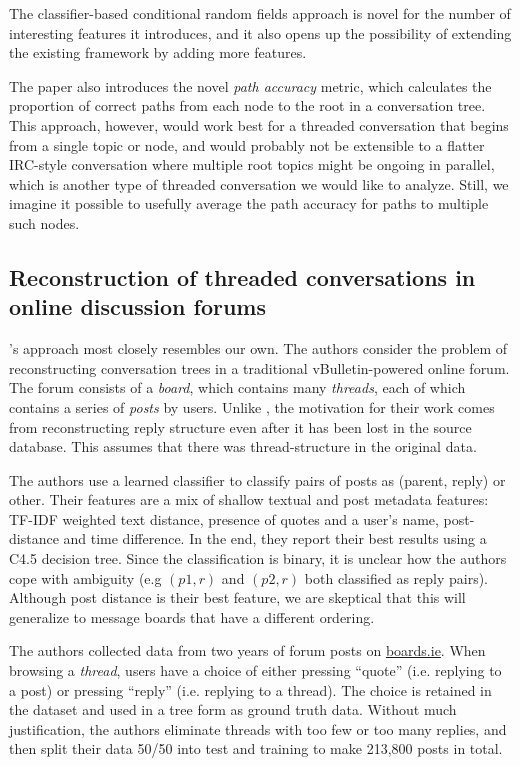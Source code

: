 \documentclass{article}
\begin{document}
The classifier-based conditional random fields approach is novel for the number
of interesting features it introduces, and it also opens up the possibility of
extending the existing framework by adding more features.

The paper also introduces the novel \emph{path accuracy} metric, which
calculates the proportion of correct paths from each node to the root in a
conversation tree. This approach, however, would work best for a threaded
conversation that begins from a single topic or node, and would probably not be
extensible to a flatter IRC-style conversation where multiple root topics might
be ongoing in parallel, which is another type of threaded conversation we would
like to analyze. Still, we imagine it possible to usefully average the path
accuracy for paths to multiple such nodes.

\subsection{Reconstruction of threaded conversations in online discussion
forums}
\cite{Aumayr2011a}'s approach most closely resembles our own. The authors
consider the problem of reconstructing conversation trees in a traditional
vBulletin-powered online forum. The forum consists of a \textit{board}, which
contains many \textit{threads}, each of which contains a series of
\textit{posts} by users. Unlike \cite{Wang2008a}, the motivation for their work
comes from reconstructing reply structure even after it has been lost in the
source database. This assumes that there was thread-structure in the original
data.

The authors use a learned classifier to classify pairs of posts as (parent,
reply) or other. Their features are a mix of shallow textual and post
metadata features: TF-IDF weighted text distance, presence of quotes and a
user's name, post-distance and time difference. In the end, they report their 
best results using a C4.5 decision tree. Since the classification is binary, it 
is unclear how the authors cope with ambiguity (e.g $(p1, r)$ and $(p2,r)$ both 
classified as reply pairs). Although post distance is their best feature, we are skeptical
that this will generalize to message boards that have a different ordering.

The authors collected data from two years of forum posts on
\url{boards.ie}. When browsing a \textit{thread}, users have a choice of either
pressing ``quote'' (i.e. replying to a post) or pressing ``reply'' (i.e.
replying to a thread). The choice is retained in the dataset and used in a
tree form as ground truth data. Without much justification, the authors eliminate
threads with too few or too many replies, and then split their data 50/50 into 
test and training to make 213,800 posts in total.
\end{document}
